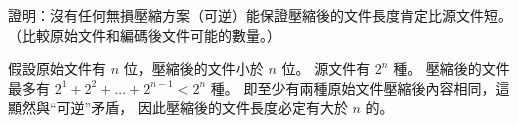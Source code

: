\startEXERCISE
證明：沒有任何無損壓縮方案（可逆）能保證壓縮後的文件長度肯定比源文件短。
（\hint 比較原始文件和編碼後文件可能的數量。）
\stopEXERCISE

\startANSWER
假設原始文件有 $n$ 位，壓縮後的文件小於 $n$ 位。
源文件有 $2^n$ 種。
壓縮後的文件最多有 $2^1 + 2^2 + \ldots + 2^{n-1} < 2^n$ 種。
即至少有兩種原始文件壓縮後內容相同，這顯然與“可逆”矛盾，
因此壓縮後的文件長度必定有大於 $n$ 的。
\stopANSWER
